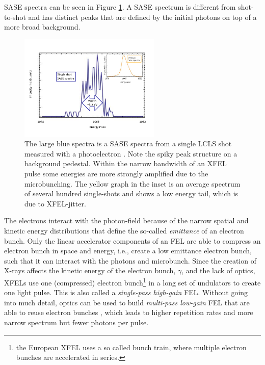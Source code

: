 SASE spectra can be seen in Figure \ref{fig:SASE-spectra}. A SASE spectrum is different from shot-to-shot and has distinct peaks that are defined by the initial photons on top of a more broad background.
\begin{figure}
	\centering
		\includegraphics[width=0.60\textwidth]{images/SASE-spectra.png}
	\caption[SASE single-shot and average spectra]{The large blue spectra is a SASE spectra from a single LCLS shot measured with a photoelectron \citep[see][]{Bucher-2014-Unpublished}. Note the spiky peak structure on a background pedestal. Within the narrow bandwidth of an XFEL pulse some energies are more strongly amplified due to the microbunching. The yellow graph in the inset is an average spectrum of several hundred single-shots and shows a low energy tail, which is due to XFEL-jitter.}
	\label{fig:SASE-spectra}
\end{figure}
The electrons interact with the photon-field because of the narrow spatial and kinetic energy distributions that define the so-called \textit{emittance} of an electron bunch. Only the linear accelerator components of an FEL are able to compress an electron bunch in space and energy, i.e., create a low emittance electron bunch, such that it can interact with the photons and microbunch. Since the creation of X-rays affects the kinetic energy of the electron bunch, $\gamma$, and the lack of optics, XFELs use one (compressed) electron bunch\footnote{the European XFEL uses a so called bunch train, where multiple electron bunches are accelerated in series.} in a long set of undulators to create one light pulse. This is also called a \textit{single-pass high-gain} FEL. Without going into much detail, optics can be used to build \textit{multi-pass low-gain} FEL that are able to reuse electron bunches \citep{Kim-2008-PRL}, which leads to higher repetition rates and more narrow spectrum but fewer photons per pulse.
%
%
%
%
